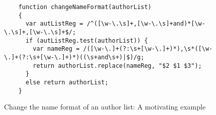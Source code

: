 \begin{figure*}[htbp]
\begin{center}
{
\begin{verbatim}
    function changeNameFormat(authorList)
    {
      var autListReg = /^([\w-\.\s]+,[\w-\.\s]+and)*[\w-\.\s]+,[\w-\.\s]+$/;
      if (autListReg.test(authorList)) {
        var nameReg = /([\w-\.]+(?:\s+[\w-\.]+)*),\s*([\w-\.]+(?:\s+[\w-\.]+)*)((\s+and\s+)|$)/g;
        return authorList.replace(nameReg, "$2 $1 $3");
      }
      else return authorList;
    }
\end{verbatim}
}
\end{center}
\caption{Change the name format of an author list: A motivating example}
\label{fig-run-exmp}
\end{figure*}
